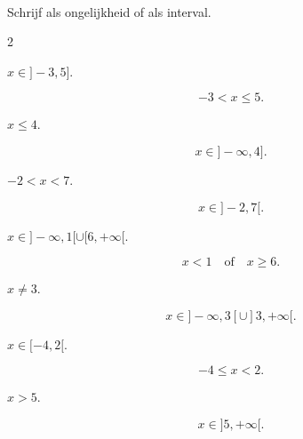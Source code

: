 \documentclass{ximera}
\begin{document}
\begin{oefening}{\oefB}
\\

Schrijf als ongelijkheid of als interval.

\begin{multicols}{2}

\begin{question}
$x\in]-3,5]$.

\begin{oplossing}
\[
-3<x\leq5.
\]
\end{oplossing}
\end{question}


\begin{question}
$x\leq4$.

\begin{oplossing}
\[
x\in]-\infty,4].
\]
\end{oplossing}
\end{question}


\begin{question}
$-2<x<7$.

\begin{oplossing}
\[
x\in]-2,7[.
\]
\end{oplossing}
\end{question}


\begin{question}
$x\in]-\infty,1[\cup[6,+\infty[$.

\begin{oplossing}
\[
x<1
\quad\text{of}\quad
x\geq6.
\]
\end{oplossing}
\end{question}


\begin{question}
$x\neq3$.

\begin{oplossing}
\[
x\in]-\infty,3[
\cup
]3,+\infty[.
\]
\end{oplossing}
\end{question}


\begin{question}
$x\in[-4,2[$.

\begin{oplossing}
\[
-4\leq x<2.
\]
\end{oplossing}
\end{question}


\begin{question}
$x>5$.

\begin{oplossing}
\[
x\in]5,+\infty[.
\]
\end{oplossing}
\end{question}



\end{multicols}
\end{oefening}
\end{document}
